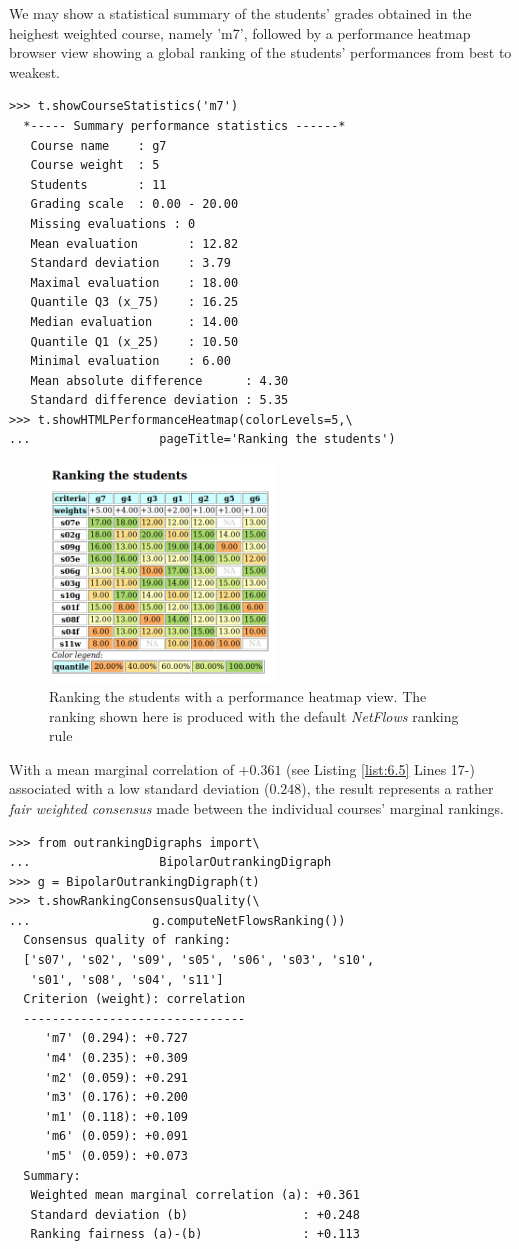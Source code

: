 We may show a statistical summary of the students' grades obtained in the heighest weighted course, namely 'm7', followed by a performance heatmap browser view showing a global ranking of the students' performances from best to weakest.
\begin{lstlisting}[caption={Student performance summary statistics per course},label=list:6.6]
>>> t.showCourseStatistics('m7')
  *----- Summary performance statistics ------*
   Course name    : g7
   Course weight  : 5
   Students       : 11
   Grading scale  : 0.00 - 20.00
   Missing evaluations : 0
   Mean evaluation       : 12.82
   Standard deviation    : 3.79
   Maximal evaluation    : 18.00
   Quantile Q3 (x_75)    : 16.25
   Median evaluation     : 14.00
   Quantile Q1 (x_25)    : 10.50
   Minimal evaluation    : 6.00
   Mean absolute difference      : 4.30
   Standard difference deviation : 5.35
>>> t.showHTMLPerformanceHeatmap(colorLevels=5,\
...                  pageTitle='Ranking the students')
\end{lstlisting}
\begin{figure}[h]
\sidecaption
\includegraphics[width=6cm]{Figures/rankingStudents.png}
\caption{Ranking the students with a performance heatmap view. The ranking shown here is produced with the default \emph{NetFlows} ranking rule}
\label{fig:6.6}       %
\end{figure}

With a mean marginal correlation of $+0.361$ (see Listing \ref{list:6.5} Lines 17-) associated with a low standard deviation ($0.248$), the result represents a rather \emph{fair weighted consensus} made between the individual courses' marginal rankings.
\begin{lstlisting}[caption={Consensus quality of the students's ranking},label=list:6.7]
>>> from outrankingDigraphs import\
...                  BipolarOutrankingDigraph
>>> g = BipolarOutrankingDigraph(t)
>>> t.showRankingConsensusQuality(\
...                 g.computeNetFlowsRanking())
  Consensus quality of ranking:
  ['s07', 's02', 's09', 's05', 's06', 's03', 's10',
   's01', 's08', 's04', 's11']
  Criterion (weight): correlation
  -------------------------------
     'm7' (0.294): +0.727
     'm4' (0.235): +0.309
     'm2' (0.059): +0.291
     'm3' (0.176): +0.200
     'm1' (0.118): +0.109
     'm6' (0.059): +0.091
     'm5' (0.059): +0.073
  Summary:
   Weighted mean marginal correlation (a): +0.361
   Standard deviation (b)                : +0.248
   Ranking fairness (a)-(b)              : +0.113
\end{lstlisting}
   
